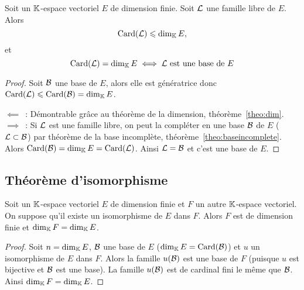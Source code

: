 \begin{theo}
  Soit un \(\mathbb{K}\)-espace vectoriel \(E\) de dimension finie. Soit \(\mathcal{L}\) une 
  famille libre de \(E\). Alors
  \begin{equation}
    \operatorname{Card}(\mathcal{L}) \leqslant \operatorname{dim}_{\mathbb{K}} E,
  \end{equation}
  et
  \begin{equation}
    \operatorname{Card}(\mathcal{L})=\operatorname{dim}_{\mathbb{K}} E \iff \mathcal{L} \text{~est une base de } E
  \end{equation}
\end{theo}
\begin{proof}
  Soit \(\mathcal{B}\) une base de \(E\), alors elle est génératrice donc \(\operatorname{Card}(\mathcal{L}) 
  \leqslant \operatorname{Card}(\mathcal{B})=\operatorname{dim}_{\mathbb{K}} E\).

  \(\impliedby\)~: Démontrable grâce au théorème de la dimension, théorème~\ref{theo:dim}.  \(\implies\)~: Si \(\mathcal{L}\) est une famille libre, on peut la 
  compléter en une base \(\mathcal{B}\) de \(E\) (\(\mathcal{L} \subset \mathcal{B}\)) par théorème de la 
  base incomplète, théorème~\ref{theo:baseincomplete}. Alors \(\operatorname{Card}(\mathcal{B})=\operatorname{dim}_{\mathbb{K}} E = \operatorname{Card}(\mathcal{L})\). Ainsi 
  \(\mathcal{L}=\mathcal{B}\) et c'est une base de \(E\).
\end{proof}

\subsection{Théorème d'isomorphisme}

\begin{prop}
  Soit un \(\mathbb{K}\)-espace vectoriel \(E\) de dimension finie et \(F\) un autre 
  \(\mathbb{K}\)-espace vectoriel. On suppose qu'il existe un isomorphisme de \(E\) dans 
  \(F\). Alors \(F\) est de dimension finie et \(\operatorname{dim}_{\mathbb{K}} F = \operatorname{dim}_{\mathbb{K}} E\).
\end{prop}
\begin{proof}
  Soit \(n = \operatorname{dim}_{\mathbb{K}} E\), \(\mathcal{B}\) une base de \(E\) (\(\operatorname{dim}_{\mathbb{K}} E = \operatorname{Card}(\mathcal{B})\)) 
  et \(u\) un isomorphisme de \(E\) dans \(F\). Alors la famille \(u(\mathcal{B})\) est 
  une base de \(F\) (puisque \(u\) est bijective et \(\mathcal{B}\) est une base). La 
  famille \(u(\mathcal{B})\) est de cardinal fini le même que \(\mathcal{B}\). Ainsi \(\operatorname{dim}_{\mathbb{K}} F = 
  \operatorname{dim}_{\mathbb{K}} E\).
\end{proof}

